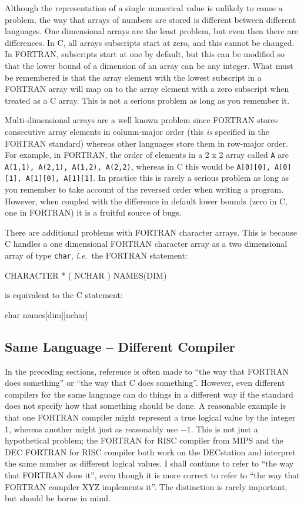 \documentclass[twoside,11pt,nolof]{starlink}
\begin{document}
Although the representation of a single numerical value is unlikely to cause a
problem, the way that arrays of numbers are stored is different between
different languages. One dimensional arrays are the least problem, but even
then there are differences. In C, all arrays subscripts start at zero, and this
cannot be changed. In FORTRAN, subscripts start at one by default, but this can
be modified so that the lower bound of a dimension of an array can be any
integer. What must be remembered is that the array element with the lowest
subscript in a FORTRAN array will map on to the array element with a zero
subscript when treated as a C array. This is not a serious problem as long as
you remember it.

Multi-dimensional arrays are a well known problem since FORTRAN stores
consecutive array elements in column-major order (this \textit{is}\/ specified
in the FORTRAN standard) whereas other languages store them in row-major order.
For example, in FORTRAN, the order of elements in a 2 x 2 array called
\texttt{A} are \texttt{A(1,1), A(2,1), A(1,2), A(2,2)}, whereas in C this would
be \texttt{A[0][0], A[0][1], A[1][0], A[1][1]}.
In practice this is rarely a serious problem as long as you
remember to take account of the reversed order when writing a program. However,
when coupled with the difference in default lower bounds (zero in C, one in
FORTRAN) it is a fruitful source of bugs.

There are additional problems with FORTRAN character arrays.
This is because C handles a one dimensional FORTRAN character array as a two
dimensional array of type \texttt{char}, \textit{i.e.}\ the FORTRAN statement:

\begin{terminalv}
CHARACTER * ( NCHAR ) NAMES(DIM)
\end{terminalv}

is equivalent to the C statement:

\begin{terminalv}
char names[dim][nchar]
\end{terminalv}

\subsection{Same Language -- Different Compiler}

In the preceding sections, reference is often made to ``the way that FORTRAN
does something'' or ``the way that C does something''. However, even different
compilers for the same language can do things in a different way if the
standard does not specify how that something should be done. A reasonable
example is that one FORTRAN compiler might represent a true logical value by
the integer 1, whereas another might just as reasonably use $-1$. This is not
just a hypothetical problem; the FORTRAN for RISC compiler from MIPS and the
DEC FORTRAN for RISC compiler both work on the DECstation and interpret the
same number as different logical values. I shall continue to refer to ``the way
that FORTRAN does it'', even though it is more correct to refer to ``the way
that FORTRAN compiler XYZ implements it''.
The distinction is rarely important, but should be borne in mind.
\end{document}

